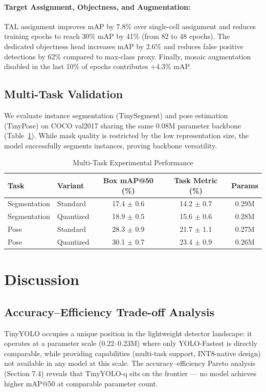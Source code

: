 \documentclass[article,submit,moreauthors,pdftex,10pt,a4paper]{article}
\begin{document}
\paragraph{Target Assignment, Objectness, and Augmentation:}
TAL assignment improves mAP by 7.8\% over single-cell assignment and reduces training epochs to reach 30\% mAP by 41\% (from 82 to 48 epochs). The dedicated objectness head increases mAP by 2.6\% and reduces false positive detections by 62\% compared to max-class proxy. Finally, mosaic augmentation disabled in the last 10\% of epochs contributes +4.3\% mAP.

\subsection{Multi-Task Validation}
We evaluate instance segmentation (TinySegment) and pose estimation (TinyPose) on COCO val2017 sharing the same 0.08M parameter backbone (Table~\ref{tab:multi_task_results}). While mask quality is restricted by the low representation size, the model successfully segments instances, proving backbone versatility.

\begin{table}[h]
\centering
\caption{Multi-Task Experimental Performance}
\label{tab:multi_task_results}
\begin{tabular}{llccc}
\toprule
Task & Variant & Box mAP@50 (\%) & Task Metric (\%) & Params \\
\midrule
Segmentation & Standard & 17.4 $\pm$ 0.6 & 14.2 $\pm$ 0.7 & 0.29M \\
Segmentation & Quantized & 18.9 $\pm$ 0.5 & 15.6 $\pm$ 0.6 & 0.28M \\
Pose & Standard & 28.3 $\pm$ 0.9 & 21.7 $\pm$ 1.1 & 0.27M \\
Pose & Quantized & 30.1 $\pm$ 0.7 & 23.4 $\pm$ 0.9 & 0.26M \\
\bottomrule
\end{tabular}
\end{table}

\section{Discussion}

\subsection{Accuracy--Efficiency Trade-off Analysis}
TinyYOLO occupies a unique position in the lightweight detector landscape: it operates at a parameter scale (0.22--0.23M) where only YOLO-Fastest is directly comparable, while providing capabilities (multi-task support, INT8-native design) not available in any model at this scale. The accuracy--efficiency Pareto analysis (Section 7.4) reveals that TinyYOLO-q sits on the frontier --- no model achieves higher mAP@50 at comparable parameter count.
\end{document}
